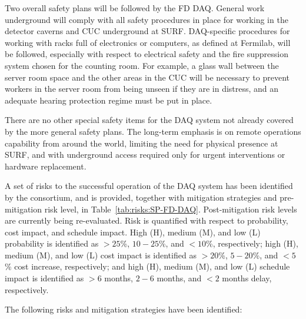 Two overall safety plans will be followed by the FD DAQ. General work underground will comply
with all safety procedures in place for working in the detector caverns and CUC underground at
SURF. DAQ-specific procedures for working with racks full of
electronics or computers, as defined 
at Fermilab, will be followed, especially with respect to electrical safety and the fire suppression
system chosen for the counting room. For example, a glass wall between the server room space and
the other areas in the CUC will be necessary to prevent workers in the server room from being
unseen if they are in distress, and an adequate hearing protection
regime must be put in place.

There are no other special safety items for the DAQ system not already covered by the more general safety plans. The long-term emphasis is on remote operations capability from around the world, limiting the need for physical presence at SURF, and with underground access required only for urgent interventions or hardware replacement. 

A set of risks to the successful operation of the DAQ system has been
identified by the consortium, and is provided,
together with mitigation strategies and pre-mitigation risk level, 
in Table~\ref{tab:risks:SP-FD-DAQ}. Post-mitigation risk levels are
currently being re-evaluated. Risk is quantified with respect to
probability, cost impact, and schedule impact. High (H), medium (M), and low (L)
probability is identified as
$>25$\%, $10-25$\%, and $<10$\%, respectively; high (H), medium (M), and low (L)
cost impact is identified as
$>20$\%, $5-20$\%, and $<5$\% cost increase, respectively; and high
(H), medium (M), and low (L) schedule impact is identified as 
$>6$ months, $2-6$ months, and $<2$ months delay, respectively.



The following risks and mitigation strategies have been identified:

